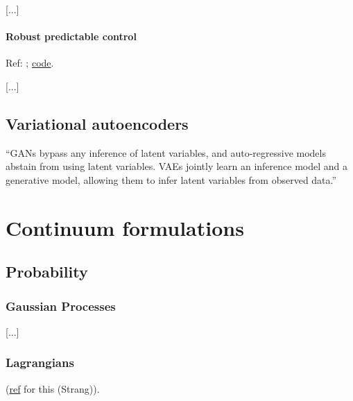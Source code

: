 \documentclass[notitlepage,openany,11pt]{report}
\numberwithin{equation}{section}
\theoremstyle{plain}%
\begin{document}
[...]


\subsubsection{Robust predictable control}
Ref: \cite{EysenbachEtAl:21a}; \href{https://ben-eysenbach.github.io/rpc/}{code}.

[...]


\section{Variational autoencoders}

``GANs bypass any inference of latent variables, and auto-regressive models abstain from using latent variables. VAEs jointly learn an inference model and a generative model, allowing them to infer latent variables from observed data.''





\chapter{Continuum formulations}

\section{Probability}


\subsection{Gaussian Processes}

[...]


\subsection{Lagrangians}
(\href{http://math.mit.edu/classes/18.086/2006/am72.pdf}{ref} for this (Strang)). 
\end{document}

